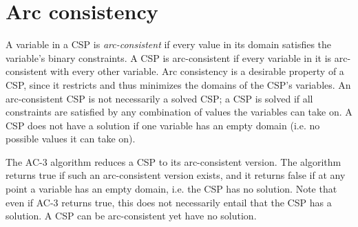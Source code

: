 \section{Arc consistency}\label{sec:arc-consistency}

A variable in a CSP is \emph{arc-consistent} if every value in its domain satisfies the variable's binary constraints.
A CSP is arc-consistent if every variable in it is arc-consistent with every other variable.
Arc consistency is a desirable property of a CSP, since it restricts and thus minimizes the domains of the CSP's variables.
An arc-consistent CSP is not necessarily a solved CSP; a CSP is solved if all constraints are satisfied by any combination of values the variables can take on.
A CSP does not have a solution if one variable has an empty domain (i.e. no possible values it can take on).

The AC-3 algorithm reduces a CSP to its arc-consistent version. The algorithm returns true if such an arc-consistent version exists, and it returns false if at any point a variable has an empty domain, i.e. the CSP has no solution.
Note that even if AC-3 returns true, this does not necessarily entail that the CSP has a solution. A CSP can be arc-consistent yet have no solution.
